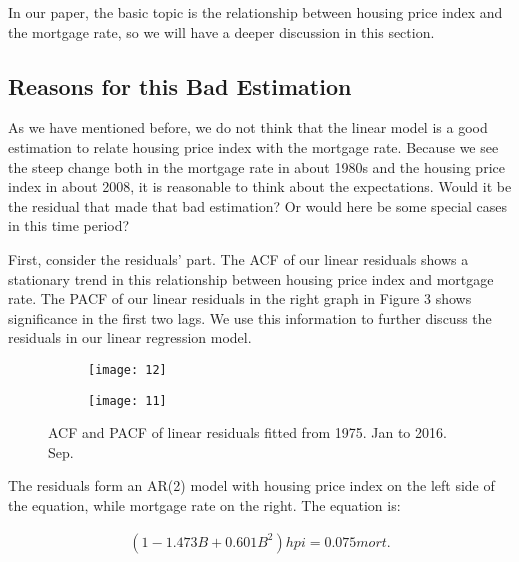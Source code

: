 \documentclass[12pt,letterpaper]{article}
\begin{document}
In our paper, the basic topic is the relationship between housing price index and the mortgage rate, so we will have a deeper discussion in this section.

\subsection{Reasons for this Bad Estimation}
As we have mentioned before, we do not think that the linear model is a good estimation to relate housing price index with the mortgage rate.
Because we see the steep change both in the mortgage rate in about 1980s and the housing price index in about 2008, it is reasonable to think about the expectations.
Would it be the residual that made that bad estimation? 
Or would here be some special cases in this time period?

First, consider the residuals' part.
The ACF of our linear residuals shows a stationary trend in this relationship between housing price index and mortgage rate. 
The PACF of our linear residuals in the right graph in Figure 3 shows significance in the first two lags.
We use this information to further discuss the residuals in our linear regression model.

\begin{figure*}[h!]
\begin{subfigure}[b]{0.4\textwidth}
\begin{center}
 \texttt{[image: 12]}
 \vspace{-0.4cm}
\end{center}
\end{subfigure}
\qquad
\qquad
\begin{subfigure}[b]{0.4\textwidth}
\begin{center}
 \texttt{[image: 11]}
 \vspace{-0.4cm}
\end{center}
\end{subfigure}
 \vspace{-.1cm}
 \caption{ ACF and PACF of linear residuals fitted from 1975. Jan to 2016. Sep.}
      \label{fig:time}
\vspace{-.25cm}
\end{figure*}

The residuals form an AR(2) model with housing price index on the left side of the equation, while mortgage rate on the right.
The equation is: 

\begin{equation}
\begin{aligned}
(1-1.473B+0.601B^2) hpi = 0.075mort.
\end{aligned}
\end{equation}
\end{document}
